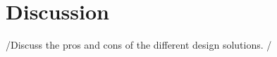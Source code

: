 \newpage
\section{Discussion}
\label{S5}
/{Discuss the pros and cons of the different design solutions.} /
